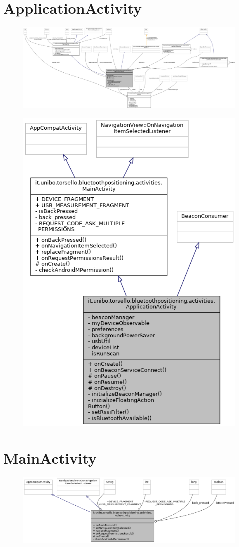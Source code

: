 \section{ApplicationActivity}
\begin{figure}[ph]
	\centering
	\includegraphics[width=1.2\linewidth]{img/uml/class/classit_1_1unibo_1_1torsello_1_1bluetoothpositioning_1_1activities_1_1ApplicationActivity__coll__graph.png}
	\caption{}
\end{figure}

\begin{figure}[ph]
	\centering
	\includegraphics[width=0.5\linewidth]{img/uml/class/classit_1_1unibo_1_1torsello_1_1bluetoothpositioning_1_1activities_1_1ApplicationActivity__inherit__graph.png}
	\caption{}
\end{figure}

\newpage
\section{MainActivity}
\begin{figure}[ph]
	\centering
	\includegraphics[width=1.2\linewidth]{img/uml/class/classit_1_1unibo_1_1torsello_1_1bluetoothpositioning_1_1activities_1_1MainActivity__coll__graph.png}
	\caption{}
\end{figure}

